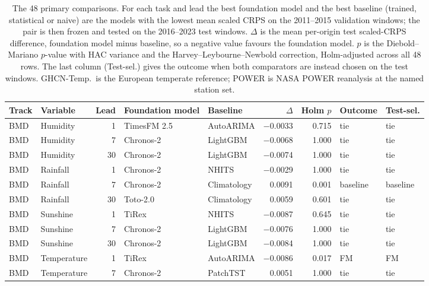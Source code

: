 \begin{table}[htbp]
  \centering
  \scriptsize
  \setlength{\tabcolsep}{2.5pt}
  \caption{The 48 primary comparisons. For each task and lead the best foundation model and the best baseline (trained, statistical or naive) are the models with the lowest mean scaled CRPS on the 2011--2015 validation windows; the pair is then frozen and tested on the 2016--2023 test windows. $\Delta$ is the mean per-origin test scaled-CRPS difference, foundation model minus baseline, so a negative value favours the foundation model. $p$ is the Diebold--Mariano $p$-value with HAC variance and the Harvey--Leybourne--Newbold correction, Holm-adjusted across all 48 rows. The last column (Test-sel.) gives the outcome when both comparators are instead chosen on the test windows. GHCN-Temp.\ is the European temperate reference; POWER is NASA POWER reanalysis at the named station set.}
  \label{tab:comparators}
  \begin{tabular}{llrllrrll}
    \toprule
    Track & Variable & Lead & Foundation model & Baseline & $\Delta$ & Holm $p$ & Outcome & Test-sel. \\
    \midrule
    BMD & Humidity & 1 & TimesFM 2.5 & AutoARIMA & \num{-0.0033} & \num{0.715} & tie & tie \\
    BMD & Humidity & 7 & Chronos-2 & LightGBM & \num{-0.0068} & \num{1.000} & tie & tie \\
    BMD & Humidity & 30 & Chronos-2 & LightGBM & \num{-0.0074} & \num{1.000} & tie & tie \\
    BMD & Rainfall & 1 & Chronos-2 & NHITS & \num{-0.0029} & \num{1.000} & tie & tie \\
    BMD & Rainfall & 7 & Chronos-2 & Climatology & \num{+0.0091} & \num{0.001} & baseline & baseline \\
    BMD & Rainfall & 30 & Toto-2.0 & Climatology & \num{+0.0059} & \num{0.601} & tie & tie \\
    BMD & Sunshine & 1 & TiRex & NHITS & \num{-0.0087} & \num{0.645} & tie & tie \\
    BMD & Sunshine & 7 & Chronos-2 & LightGBM & \num{-0.0076} & \num{1.000} & tie & tie \\
    BMD & Sunshine & 30 & Chronos-2 & LightGBM & \num{-0.0084} & \num{1.000} & tie & tie \\
    BMD & Temperature & 1 & TiRex & AutoARIMA & \num{-0.0086} & \num{0.017} & FM & FM \\
    BMD & Temperature & 7 & Chronos-2 & PatchTST & \num{+0.0051} & \num{1.000} & tie & tie \\

\end{tabular}
\end{table}
